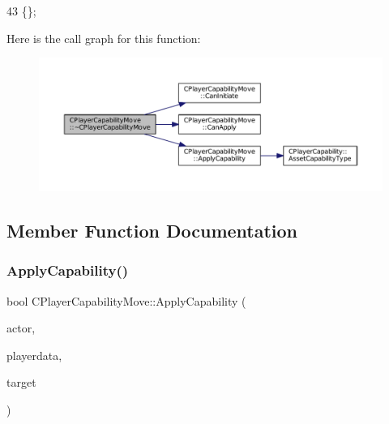 \begin{DoxyCode}
43 \{\};
\end{DoxyCode}
Here is the call graph for this function\+:
\nopagebreak
\begin{figure}[H]
\begin{center}
\leavevmode
\includegraphics[width=350pt]{classCPlayerCapabilityMove_ab355e3a0f8c82ee10b5ccf95c9e32d89_cgraph}
\end{center}
\end{figure}


\subsection{Member Function Documentation}
\hypertarget{classCPlayerCapabilityMove_ade3f4e72612cbf2ad73a6c2e6aa843df}{}\label{classCPlayerCapabilityMove_ade3f4e72612cbf2ad73a6c2e6aa843df} 
\subsubsection{\texorpdfstring{Apply\+Capability()}{ApplyCapability()}}
{\footnotesize\ttfamily bool C\+Player\+Capability\+Move\+::\+Apply\+Capability (\begin{DoxyParamCaption}\item[{std\+::shared\+\_\+ptr$<$ \hyperlink{classCPlayerAsset}{C\+Player\+Asset} $>$}]{actor,  }\item[{std\+::shared\+\_\+ptr$<$ \hyperlink{classCPlayerData}{C\+Player\+Data} $>$}]{playerdata,  }\item[{std\+::shared\+\_\+ptr$<$ \hyperlink{classCPlayerAsset}{C\+Player\+Asset} $>$}]{target }\end{DoxyParamCaption})\hspace{0.3cm}{\ttfamily [virtual]}}



